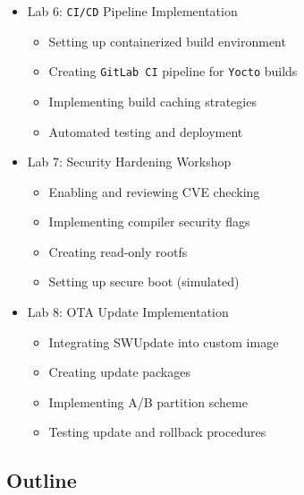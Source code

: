 \documentclass[
]{article}
\providecommand{\tightlist}{%
  \setlength{\itemsep}{0pt}\setlength{\parskip}{0pt}}
\begin{document}
\begin{itemize}
  \begin{itemize}
  \tightlist
  \item
    Designing a custom embedded \texttt{Linux} image
  \item
    Implementing partition layout with WIC
  \item
    Adding custom packages and features
  \item
    Optimizing image size
  \end{itemize}
\item
  Lab 6: \texttt{CI/CD} Pipeline Implementation

  \begin{itemize}
  \tightlist
  \item
    Setting up containerized build environment
  \item
    Creating \texttt{GitLab\ CI} pipeline for \texttt{Yocto} builds
  \item
    Implementing build caching strategies
  \item
    Automated testing and deployment
  \end{itemize}
\item
  Lab 7: Security Hardening Workshop

  \begin{itemize}
  \tightlist
  \item
    Enabling and reviewing CVE checking
  \item
    Implementing compiler security flags
  \item
    Creating read-only rootfs
  \item
    Setting up secure boot (simulated)
  \end{itemize}
\item
  Lab 8: OTA Update Implementation

  \begin{itemize}
  \tightlist
  \item
    Integrating SWUpdate into custom image
  \item
    Creating update packages
  \item
    Implementing A/B partition scheme
  \item
    Testing update and rollback procedures
  \end{itemize}
\end{itemize}

\subsection{Outline}\label{outline}
\end{document}
